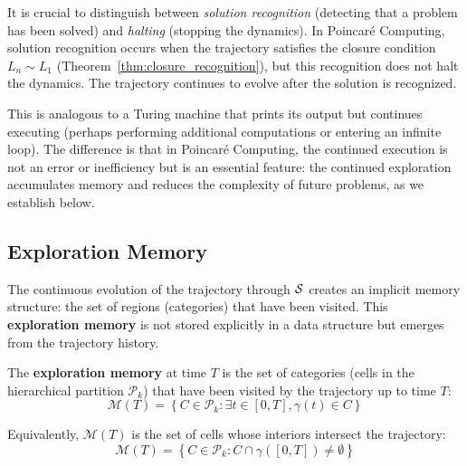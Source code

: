 \begin{remark}
\label{rem:solution_vs_halting}
It is crucial to distinguish between \textit{solution recognition} (detecting that a problem has been solved) and \textit{halting} (stopping the dynamics). In Poincaré Computing, solution recognition occurs when the trajectory satisfies the closure condition $L_n \sim L_1$ (Theorem~\ref{thm:closure_recognition}), but this recognition does not halt the dynamics. The trajectory continues to evolve after the solution is recognized.

This is analogous to a Turing machine that prints its output but continues executing (perhaps performing additional computations or entering an infinite loop). The difference is that in Poincaré Computing, the continued execution is not an error or inefficiency but is an essential feature: the continued exploration accumulates memory and reduces the complexity of future problems, as we establish below.
\end{remark}

\subsection{Exploration Memory}

The continuous evolution of the trajectory through $\mathcal{S}$ creates an implicit memory structure: the set of regions (categories) that have been visited. This \textbf{exploration memory} is not stored explicitly in a data structure but emerges from the trajectory history.

\begin{definition}
\label{def:exploration_memory}
The \textbf{exploration memory} at time $T$ is the set of categories (cells in the hierarchical partition $\mathcal{P}_k$) that have been visited by the trajectory up to time $T$:
\begin{equation}
\mathcal{M}(T) = \left\{ C \in \mathcal{P}_k : \exists t \in [0, T], \gamma(t) \in C \right\}
\label{eq:exploration_memory}
\end{equation}

Equivalently, $\mathcal{M}(T)$ is the set of cells whose interiors intersect the trajectory:
\begin{equation}
\mathcal{M}(T) = \left\{ C \in \mathcal{P}_k : C \cap \gamma([0, T]) \neq \emptyset \right\}
\end{equation}
\end{definition}

